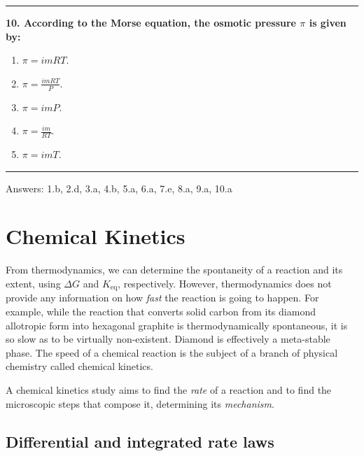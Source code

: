 \documentclass[
  9pt,
]{extbook}
\providecommand{\tightlist}{%
  \setlength{\itemsep}{0pt}\setlength{\parskip}{0pt}}
\theoremstyle{definition}
\theoremstyle{definition}
\theoremstyle{definition}
\theoremstyle{remark}
\begin{document}
\begin{center}\rule{0.5\linewidth}{0.5pt}\end{center}

\textbf{10. According to the Morse equation, the osmotic pressure \(\pi\) is given by:}

\begin{enumerate}
\def\labelenumi{\alph{enumi}.}
\tightlist
\item
  \(\pi = imRT\).
\item
  \(\pi = \frac{imRT}{P}\).
\item
  \(\pi = imP\).
\item
  \(\pi = \frac{im}{RT}\).
\item
  \(\pi = imT\).
\end{enumerate}

\begin{center}\rule{0.5\linewidth}{0.5pt}\end{center}

Answers: 1.b, 2.d, 3.a, 4.b, 5.a, 6.a, 7.e, 8.a, 9.a, 10.a

\hypertarget{Kinetics}{%
\chapter{Chemical Kinetics}\label{Kinetics}}

From thermodynamics, we can determine the spontaneity of a reaction and its extent, using \(\Delta G\) and \(K_{\text{eq}}\), respectively. However, thermodynamics does not provide any information on how \emph{fast} the reaction is going to happen. For example, while the reaction that converts solid carbon from its diamond allotropic form into hexagonal graphite is thermodynamically spontaneous, it is so slow as to be virtually non-existent. Diamond is effectively a meta-stable phase. The speed of a chemical reaction is the subject of a branch of physical chemistry called chemical kinetics.

A chemical kinetics study aims to find the \emph{rate} of a reaction and to find the microscopic steps that compose it, determining its \emph{mechanism}.

\hypertarget{diffintk}{%
\section{Differential and integrated rate laws}\label{diffintk}}
\end{document}
